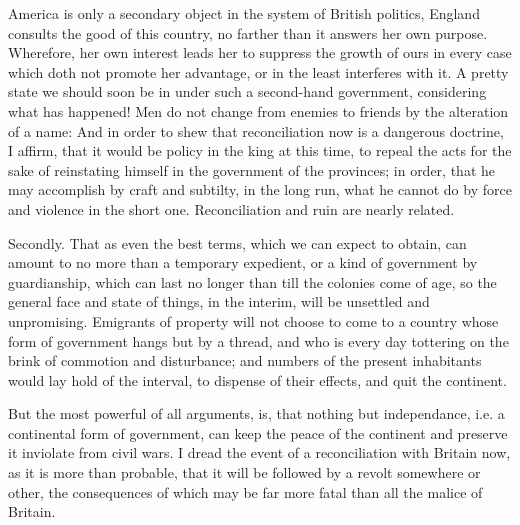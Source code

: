 \documentclass[12pt,oneside]{memoir}
\begin{document}
America is only a secondary object in the system of British politics, England consults the good of this country, no farther than it answers her own purpose. Wherefore, her own interest leads her to suppress the growth of ours in every case which doth not promote her advantage, or in the least interferes with it. A pretty state we should soon be in under such a second-hand government, considering what has happened! Men do not change from enemies to friends by the alteration of a name: And in order to shew that reconciliation now is a dangerous doctrine, I affirm, that it would be policy in the king at this time, to repeal the acts for the sake of reinstating himself in the government of the provinces; in order, that he may accomplish by craft and subtilty, in the long run, what he cannot do by force and violence in the short one. Reconciliation and ruin are nearly related.

Secondly. That as even the best terms, which we can expect to obtain, can amount to no more than a temporary expedient, or a kind of government by guardianship, which can last no longer than till the colonies come of age, so the general face and state of things, in the interim, will be unsettled and unpromising. Emigrants of property will not choose to come to a country whose form of government hangs but by a thread, and who is every day tottering on the brink of commotion and disturbance; and numbers of the present inhabitants would lay hold of the interval, to dispense of their effects, and quit the continent.

But the most powerful of all arguments, is, that nothing but independance, i.e. a continental form of government, can keep the peace of the continent and preserve it inviolate from civil wars. I dread the event of a reconciliation with Britain now, as it is more than probable, that it will be followed by a revolt somewhere or other, the consequences of which may be far more fatal than all the malice of Britain.
\end{document}
